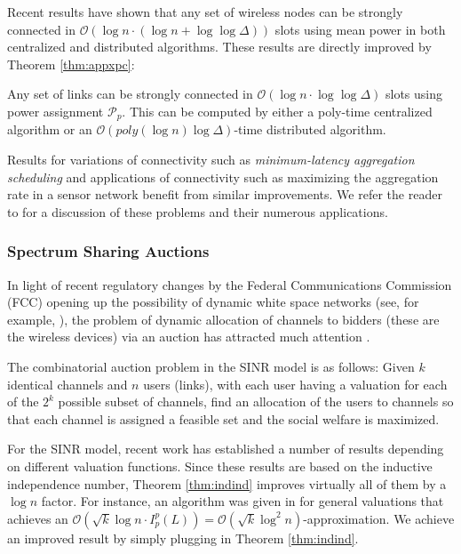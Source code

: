 \documentclass[11pt]{amsart}
\newcommand{\cal}[1]{\mathcal{#1}}
\newcommand{\BO}{\mathcal{O}}
\def\calP{{\cal P}}
\def\calP{{\cal P}}   \def\calM{{\cal M}}   \def\calU{{\cal U}}   \newcommand{\PCopt}{\overline{OPT}}
\newcommand{\powp}{\calP_p}
\begin{document}
Recent results have shown that any set of wireless nodes can be strongly connected
in $\BO(\log n \cdot (\log n + \log\log\Delta ))$ slots using mean power in both centralized \cite{HM12} and distributed \cite{PODC12} algorithms. These results are directly improved by Theorem \ref{thm:appxpc}:

\begin{theorem}
Any set of links can be strongly connected in $\BO(\log n \cdot \log\log\Delta)$ slots using power assignment $\powp$. This can be computed
by either a poly-time centralized algorithm or an $\BO(poly(\log n) \log \Delta)$-time distributed algorithm.
\end{theorem}



Results for variations of connectivity such as \emph{minimum-latency aggregation scheduling} and applications of connectivity such as maximizing the aggregation rate in a sensor network benefit from similar improvements. We refer the reader to 
\cite{HM12} for a discussion of these problems and their numerous applications.


\subsubsection*{Spectrum Sharing Auctions}
In light of recent regulatory changes by the Federal Communications Commission (FCC) opening up the possibility of dynamic white space networks (see, for example, \cite{DBLP:conf/sigcomm/BahlCMMW09}), the problem of dynamic allocation of channels to bidders (these are the wireless devices) via an auction has 
attracted much attention \cite{Zhou:2008:ESS:1409944.1409947,DBLP:conf/infocom/ZhouZ09}. 

The combinatorial auction problem in the SINR model is as follows: Given $k$ identical channels and $n$ users (links), with each user having a valuation for each of the $2^k$ possible
subset of channels, find an allocation of the users to channels so that
each channel is assigned a feasible set and the social welfare is maximized.

For the SINR model, recent work \cite{DBLP:conf/spaa/HoeferKV11,DBLP:conf/sigecom/HoeferK12} has established a number of results depending on different valuation functions. Since
these results are based on the inductive independence number, Theorem \ref{thm:indind} improves virtually all of them by a $\log n$ factor.
For instance, an algorithm was given in \cite{DBLP:conf/spaa/HoeferKV11} for general valuations 
that achieves an $\BO(\sqrt{k} \log n \cdot I^p_p(L)) = \BO(\sqrt{k} \log^2
n)$-approximation. We achieve an improved result by simply plugging in Theorem \ref{thm:indind}.
\end{document}
